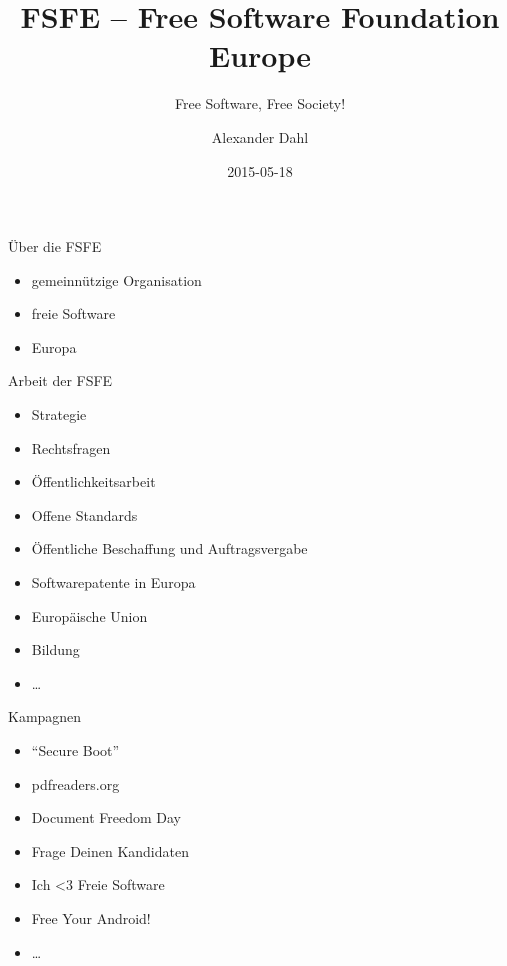 \documentclass{beamer}
\title[FSFE]{FSFE -- Free Software Foundation Europe}
\subtitle{Free Software, Free Society!}
\author{Alexander Dahl}
\institute[lespocky.de]{\url{http://www.lespocky.de/}}
\date{2015-05-18}
\begin{document}
\begin{frame}
	\titlepage
\end{frame}



\begin{frame}{Über die FSFE}
    \begin{itemize}
        \item gemeinnützige Organisation
        \pause
        \item freie Software
        \pause
        \item Europa
    \end{itemize}
\end{frame}


\begin{frame}{Arbeit der FSFE}
    \begin{itemize}
        \item Strategie
        \item Rechtsfragen
        \item Öffentlichkeitsarbeit
        \item Offene Standards
        \item Öffentliche Beschaffung und Auftragsvergabe
        \item Softwarepatente in Europa
        \item Europäische Union
        \item Bildung
        \item \dots
    \end{itemize}
\end{frame}

\begin{frame}{Kampagnen}
    \begin{itemize}
        \item \enquote{Secure Boot}
        \item pdfreaders.org
        \item Document Freedom Day
        \item Frage Deinen Kandidaten
        \item Ich <3 Freie Software
        \item Free Your Android!
        \item \dots
    \end{itemize}
\end{frame}
\end{document}
